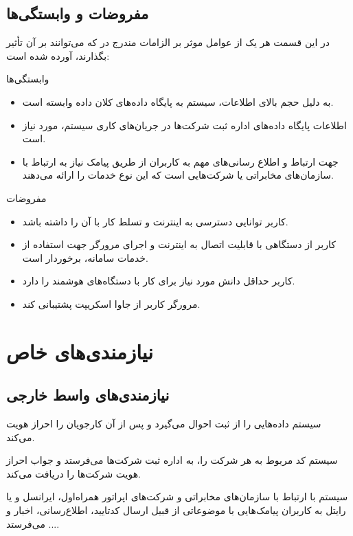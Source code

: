 \documentclass[12pt,svgnames,oneside]{book}
\newcounter{itemadded}
\let\LaTeXStandardEnumerateBegin\enumerate
\let\LaTeXStandardEnumerateEnd\endenumerate
\renewenvironment{enumerate}{%
	\LaTeXStandardEnumerateBegin%
	\setcounter{itemadded}{0}
}{%
	\LaTeXStandardEnumerateEnd%
}%
\begin{document}
			\subsection{مفروضات و وابستگی‌ها}
				در این قسمت هر یک از عوامل موثر بر الزامات مندرج در  که می‌توانند بر آن تأثیر بگذارند، آورده شده است:

				\begin{enumerate}
					\item وابستگی‌ها
					\begin{itemize}
						\item
						 به دلیل حجم بالای اطلاعات، سیستم به پایگاه داده‌های کلان داده وابسته است.
						\item
						 اطلاعات پایگاه داده‌های اداره ثبت شرکت‌ها در جریان‌های کاری سیستم، مورد نیاز است.
						\item
						جهت ارتباط و اطلاع رسانی‌های مهم به کاربران از طریق پیامک نیاز به ارتباط با سازمان‌های مخابراتی یا شرکت‌هایی است که این نوع خدمات را ارائه می‌دهند.
					\end{itemize}

					\item مفروضات
					\begin{itemize}
						\item کاربر توانایی دسترسی به اینترنت و تسلط کار با آن را داشته باشد.
						\item کاربر از دستگاهی با قابلیت اتصال به اینترنت و اجرای مرورگر جهت استفاده از خدمات سامانه، برخوردار است.
						\item کاربر حداقل دانش مورد نیاز برای کار با دستگاه‌های هوشمند را دارد.
						\item مرورگر کاربر از جاوا اسکریپت پشتیبانی کند.
					\end{itemize}
				\end{enumerate}

		\section{نیازمندی‌های خاص}
			\subsection{نیازمندی‌های واسط خارجی}
				\begin{enumerate}
					\item
					سیستم داده‌هایی را از ثبت احوال می‌گیرد و پس از آن کارجویان را  احراز هویت می‌کند.
					\item
					سیستم کد مربوط به هر شرکت را، به اداره ثبت شرکت‌ها می‌فرستد و جواب احراز هویت شرکت‌ها را دریافت می‌کند.
					\item
					سیستم با ارتباط با سازمان‌های مخابراتی و شرکت‌های اپراتور همراه‌اول، ایرانسل و یا رایتل به کاربران پیامک‌هایی با موضوعاتی از قبیل ارسال کدتایید، اطلاع‌رسانی، اخبار و ... می‌فرستد.
				\end{enumerate}
\end{document}
